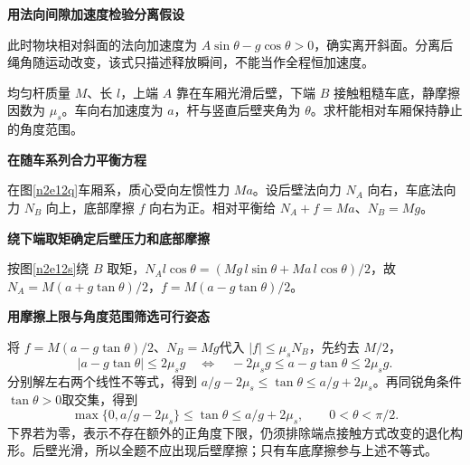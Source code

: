 \begin{solution}
\par\medskip{}\noindent\textbf{用法向间隙加速度检验分离假设}\par\nobreak
此时物块相对斜面的法向加速度为 $A\sin\theta-g\cos\theta>0$，确实离开斜面。分离后绳角随运动改变，该式只描述释放瞬间，不能当作全程恒加速度。
\end{solution}

\begin{question}\begin{example}[光滑后壁与粗糙车底之间的杆]\label{n2e12}
均匀杆质量 $M$、长 $l$，上端 $A$ 靠在车厢光滑后壁，下端 $B$ 接触粗糙车底，静摩擦因数为 $\mu_s$。车向右加速度为 $a$，杆与竖直后壁夹角为 $\theta$。求杆能相对车厢保持静止的角度范围。
\end{example}\end{question}
\begin{solution}\textbf{在随车系列合力平衡方程}\par\nobreak
在图\ref{n2e12q}车厢系，质心受向左惯性力 $Ma$。设后壁法向力 $N_A$ 向右，车底法向力 $N_B$ 向上，底部摩擦 $f$ 向右为正。相对平衡给 $N_A+f=Ma$、$N_B=Mg$。


\par\medskip{}\noindent\textbf{绕下端取矩确定后壁压力和底部摩擦}\par\nobreak
按图\ref{n2e12s}绕 $B$ 取矩，$N_A l\cos\theta=(Mg\,l\sin\theta+Ma\,l\cos\theta)/2$，故 $N_A=M(a+g\tan\theta)/2$，$f=M(a-g\tan\theta)/2$。

\par\medskip{}\noindent\textbf{用摩擦上限与角度范围筛选可行姿态}\par\nobreak
将 $f=M(a-g\tan\theta)/2$、$N_B=Mg$代入 $|f|\le\mu_sN_B$，先约去 $M/2$，
\[
 |a-g\tan\theta|\le2\mu_sg
 \quad\Longleftrightarrow\quad
 -2\mu_sg\le a-g\tan\theta\le2\mu_sg.
\]
分别解左右两个线性不等式，得到 $a/g-2\mu_s\le\tan\theta\le a/g+2\mu_s$。再同锐角条件 $\tan\theta>0$取交集，得到
\[
 \max\{0,a/g-2\mu_s\}\le\tan\theta\le a/g+2\mu_s,
 \qquad 0<\theta<\pi/2.
\]
下界若为零，表示不存在额外的正角度下限，仍须排除端点接触方式改变的退化构形。后壁光滑，所以全题不应出现后壁摩擦；只有车底摩擦参与上述不等式。
\end{solution}

